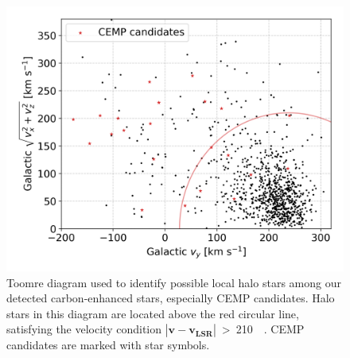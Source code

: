 \begin{figure}
	\centering
	\includegraphics[width=\columnwidth]{carbon_orbits_vy_vxvz.png}
	\caption{Toomre diagram used to identify possible local halo stars among our detected carbon-enhanced stars, especially CEMP candidates. Halo stars in this diagram are located above the red circular line, satisfying the velocity condition $\left|\mathbf{v} - \mathbf{v_{LSR}} \right|$~>~210~\kms\ \citep[the threshold taken from ][]{2018ApJ...860L..11K}. CEMP candidates are marked with star symbols.}
	\label{fig:orbits_vxvyvz}
\end{figure}
